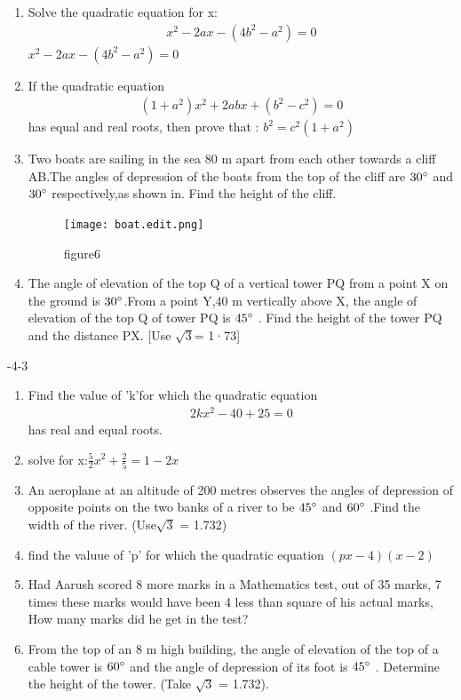 \documentclass{article}
\begin{document}
\begin{enumerate}
    \item Solve the quadratic equation for x:
    \begin{align}
    x^2-2ax-(4b^2-a^2)=0
         \end{align}
    $x^2-2ax-(4b^2-a^2)=0$
    \item If the quadratic equation
    \begin{align}
        (1+a^2)x^2+2abx+(b^2-c^2)=0
    \end{align}has equal and real roots, then prove that : 
    $b^2=c^2(1+a^2)$
\item Two boats are sailing in the sea 80 m apart from each other towards a cliff AB.The angles of depression of the boats from the top of the cliff are $30\degree$ and $30\degree$ respectively,as shown in.
Find the height of the cliff.
\begin{figure} 
	\texttt{[image: boat.edit.png]}
\caption{figure6}
\label{fig6}
\end{figure}
 \item The angle of elevation of the top Q of a vertical tower PQ from a point X on the ground is $30\degree$.From a point Y,40 m vertically above X, the angle of elevation of the top Q of tower PQ is $45\degree$ . Find the height of the tower PQ and the distance PX. [Use $\sqrt{3}$= 1·73] 
 \end{enumerate}
 \pagebreak
 -4-3
 \begin{enumerate}
     \item Find the value of 'k'for which the quadratic equation 
     \begin{align}
         2kx^2-40+25=0
     \end{align} has real and equal roots.
     \item solve for x:$\frac{5}{2}x^2+\frac{2}{5}=1-2x$
     \item An aeroplane at an altitude of 200 metres observes the angles of depression of opposite points on the two banks of a river to be $45\degree$ and $60\degree$ .Find the width of the river. (Use$\sqrt{3}$ = 1.732)
     \item find the valuue of 'p' for which the quadratic equation $(px-4) (x-2)$
     \item Had Aarush scored 8 more marks in a Mathematics test, out of 35 marks, 7 times these marks would have been 4 less than square of his actual marks, How many marks did he get in the test?
     \item From the top of an 8 m high building, the angle of elevation of the top of a cable tower is $60\degree$ and the angle of depression of its foot is $45\degree$  . Determine the height of the tower. (Take $\sqrt{3}$ = 1.732).
 \end{enumerate}
\end{document}
